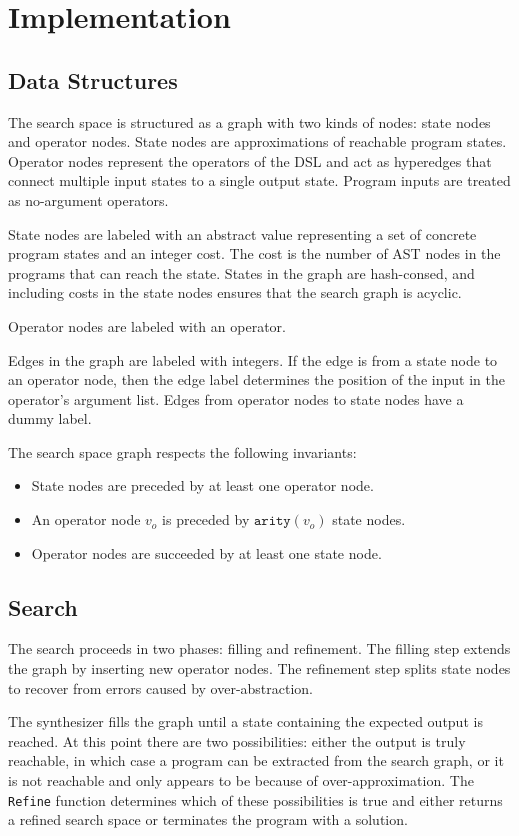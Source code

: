 \documentclass[review]{acmart}
\begin{document}
\section{Implementation}
\subsection{Data Structures}

The search space is structured as a graph with two kinds of nodes: state nodes
and operator nodes. State nodes are approximations of reachable program states.
Operator nodes represent the operators of the DSL and act as hyperedges that
connect multiple input states to a single output state. Program inputs are
treated as no-argument operators.

State nodes are labeled with an abstract value representing a set of concrete
program states and an integer cost. The cost is the number of AST nodes in the
programs that can reach the state. States in the graph are hash-consed, and
including costs in the state nodes ensures that the search graph is acyclic.

Operator nodes are labeled with an operator.

Edges in the graph are labeled with integers. If the edge is from a state node
to an operator node, then the edge label determines the position of the input in
the operator's argument list. Edges from operator nodes to state nodes have a
dummy label.

The search space graph respects the following invariants:
\begin{itemize}
\item State nodes are preceded by at least one operator node.
\item An operator node $v_o$ is preceded by $\texttt{arity}(v_o)$ state nodes.
\item Operator nodes are succeeded by at least one state node.
\end{itemize}

\subsection{Search}

The search proceeds in two phases: filling and refinement. The filling step
extends the graph by inserting new operator nodes. The refinement step splits
state nodes to recover from errors caused by over-abstraction.

The synthesizer fills the graph until a state containing the expected output is
reached. At this point there are two possibilities: either the output is truly
reachable, in which case a program can be extracted from the search graph, or it
is not reachable and only appears to be because of over-approximation. The
\texttt{Refine} function determines which of these possibilities is true and
either returns a refined search space or terminates the program with a solution.
\end{document}
